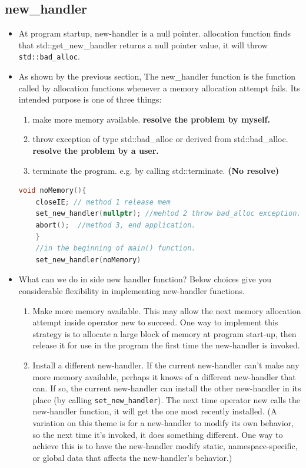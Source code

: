 \documentclass[a4paper,11pt,twoside]{book}
\begin{document}
\subsection{new\_handler}
\begin{itemize}
	\item At program startup, new-handler is a null pointer. allocation function finds that std::get\_new\_handler returns a null pointer value, it will throw \texttt{std::bad\_alloc}.
	
	\item  As shown by the previous section, The new\_handler function is the function called by allocation functions whenever a memory allocation attempt fails. Its intended purpose is one of three things:
	
	
	\begin{enumerate}
		\item make more memory available. \textbf{resolve the problem by myself.}
		
		\item throw exception of type std::bad\_alloc or derived from std::bad\_alloc. \textbf{resolve the problem by a user.}
		
		\item terminate the program. e.g. by calling std::terminate. \textbf{(No resolve)}
	\end{enumerate}
	
	\begin{lstlisting}[frame=single, language=c++]
	void noMemory(){
	closeIE; // method 1 release mem
	set_new_handler(nullptr); //mehtod 2 throw bad_alloc exception.
	abort();  //method 3, end application.
	}
	//in the beginning of main() function.
	set_new_handler(noMemory)
	\end{lstlisting}
	
	
	\item What can we do in side new handler function? Below choices give you considerable flexibility in implementing new-handler functions.
	\begin{enumerate}
		
		\item Make more memory available. This may allow the next memory allocation attempt inside operator new to succeed. One way to implement this strategy is to allocate a large block of memory at program start-up, then release it for use in the program the first time the new-handler is invoked.
		
		\item Install a different new-handler. If the current new-handler can't make any more memory available, perhaps it knows of a different new-handler that can. If so, the current new-handler can install the other new-handler in its place (by calling \texttt{set\_new\_handler}). The next time operator new calls the new-handler function, it will get the one most recently installed. (A variation on this theme is for a new-handler to modify its own behavior, so the next time it's invoked, it does something different. One way to achieve this is to have the new-handler modify static, namespace-specific, or global data that affects the new-handler's behavior.)
		

\end{enumerate}
\end{itemize}
\end{document}
